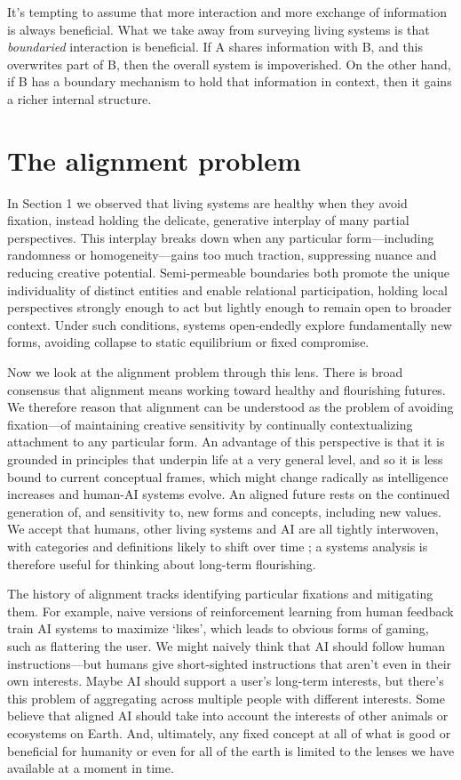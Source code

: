 \documentclass[11pt]{article}
\begin{document}
It's tempting to assume that more interaction and more exchange of information is always beneficial. What we take away from surveying living systems is that \textit{boundaried} interaction is beneficial. If A shares information with B, and this overwrites part of B, then the overall system is impoverished. On the other hand, if B has a boundary mechanism to hold that information in context, then it gains a richer internal structure. 


\section{The alignment problem}

In Section 1 we observed that living systems are healthy when they avoid fixation, instead holding the delicate, generative interplay of many partial perspectives. This interplay breaks down when any particular form---including randomness or homogeneity---gains too much traction, suppressing nuance and reducing creative potential. Semi-permeable boundaries both promote the unique individuality of distinct entities and enable relational participation, holding local perspectives strongly enough to act but lightly enough to remain open to broader context. Under such conditions, systems open-endedly explore fundamentally new forms, avoiding collapse to static equilibrium or fixed compromise.


Now we look at the alignment problem through this lens. There is broad consensus that alignment means working toward healthy and flourishing futures. We therefore reason that alignment can be understood as the problem of avoiding fixation---of maintaining creative sensitivity by continually contextualizing attachment to any particular form. An advantage of this perspective is that it is grounded in principles that underpin life at a very general level, and so it is less bound to current conceptual frames, which might change radically as intelligence increases and human-AI systems evolve. An aligned future rests on the continued generation of, and sensitivity to, new forms and concepts, including new values. We accept that humans, other living systems and AI are all tightly interwoven, with categories and definitions likely to shift over time \citep{latour2012we, bateson1972steps}; a systems analysis is therefore useful for thinking about long-term flourishing.


The history of alignment tracks identifying particular fixations and mitigating them. For example, naive versions of reinforcement learning from human feedback train AI systems to maximize `likes', which leads to obvious forms of gaming, such as flattering the user. We might naively think that AI should follow human instructions---but humans give short-sighted instructions that aren't even in their own interests. Maybe AI should support a user's long-term interests, but there's this problem of aggregating across multiple people with different interests. Some believe that aligned AI should take into account the interests of other animals or ecosystems on Earth. And, ultimately, any fixed concept at all of what is good or beneficial for humanity or even for all of the earth is limited to the lenses we have available at a moment in time.
\end{document}
